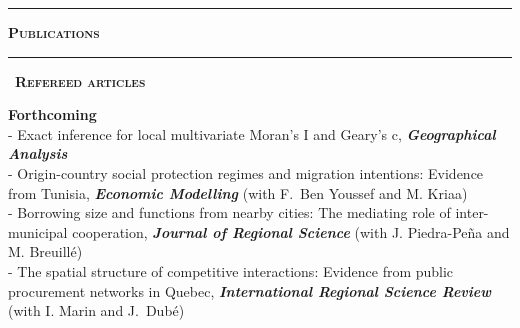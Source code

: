 \documentclass[a4paper,12pt]{article}
\newcommand{\titre}[1]{%
	\bigskip
	\noindent \rule[2mm]{\textwidth}{0.5pt}
	\textbf{\textsc{\large #1}} \\
	\noindent \rule[1mm]{\textwidth}{0.5pt}
	}
\newcommand{\smalltitre}[1]{%
	\noindent \textbullet~\textsc{\textbf{#1}}
	\smallskip
	}
\begin{document}
\bigskip


\titre{Publications}


\smalltitre{Refereed articles} \medskip

\noindent \textbf{Forthcoming}  \smallskip \\
- Exact inference for local multivariate Moran's I and Geary's c, \textit{\textbf{Geographical Analysis}} \\
- Origin-country social protection regimes and migration intentions: Evidence from Tunisia, \textit{\textbf{Economic Modelling}} (with F.~Ben Youssef and M. Kriaa) \\
- Borrowing size and functions from nearby cities: The mediating role of inter-municipal cooperation, \textit{\textbf{Journal of Regional Science}} (with J. Piedra-Peña and M. Breuillé) \\
- The spatial structure of competitive interactions: Evidence from public procurement networks in Quebec, \textit{\textbf{International Regional Science Review}} (with I. Marin and J.~Dubé)\\
\end{document}
